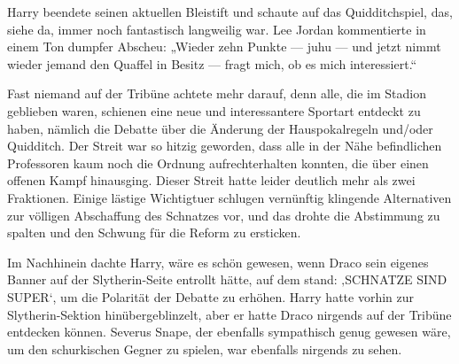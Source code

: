 Harry beendete seinen aktuellen Bleistift und schaute auf das Quidditchspiel, das, siehe da, immer noch fantastisch langweilig war. Lee Jordan kommentierte in einem Ton dumpfer Abscheu:
„Wieder zehn Punkte — juhu — und jetzt nimmt wieder jemand den Quaffel in Besitz — fragt mich, ob es mich interessiert.“

Fast niemand auf der Tribüne achtete mehr darauf, denn alle, die im Stadion geblieben waren, schienen eine neue und interessantere Sportart entdeckt zu haben, nämlich die Debatte über die Änderung der Hauspokalregeln und/oder Quidditch. Der Streit war so hitzig geworden, dass alle in der Nähe befindlichen Professoren kaum noch die Ordnung aufrechterhalten konnten, die über einen offenen Kampf hinausging. Dieser Streit hatte leider deutlich mehr als zwei Fraktionen. Einige lästige Wichtigtuer schlugen vernünftig klingende Alternativen zur völligen Abschaffung des Schnatzes vor, und das drohte die Abstimmung zu spalten und den Schwung für die Reform zu ersticken.

Im Nachhinein dachte Harry, wäre es schön gewesen, wenn Draco sein eigenes Banner auf der Slytherin-Seite entrollt hätte, auf dem stand: ‚\uppercase{Schnatze sind super}‘, um die Polarität der Debatte zu erhöhen. Harry hatte vorhin zur Slytherin-Sektion hinübergeblinzelt, aber er hatte Draco nirgends auf der Tribüne entdecken können. Severus Snape, der ebenfalls sympathisch genug gewesen wäre, um den schurkischen Gegner zu spielen, war ebenfalls nirgends zu sehen.

